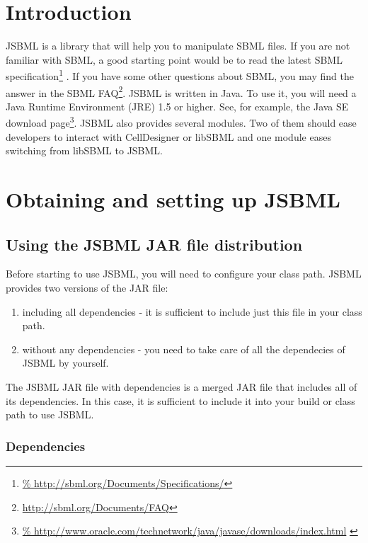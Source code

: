 \section{Introduction}

JSBML is a library that will help you to manipulate SBML files. If you are not
familiar with SBML, a good starting point would be to read the latest SBML
specification\footnote{\url{%
http://sbml.org/Documents/Specifications/}} \citep{Hucka2010a}. If you have some
other questions about SBML, you may find the answer in the SBML
FAQ\footnote{\url{http://sbml.org/Documents/FAQ}}. JSBML is written in Java\TTra. To
use it, you will need a Java Runtime Environment (JRE) 1.5 or higher. See, for
example, the Java SE download page\footnote{\url{%
http://www.oracle.com/technetwork/java/javase/downloads/index.html}
\label{fn:jvmldl}}.
JSBML also provides several modules. Two of them should ease developers to
interact with CellDesigner or libSBML and one module eases switching from
libSBML to JSBML.


\section{Obtaining and setting up JSBML}

\subsection{Using the JSBML JAR file distribution}
Before starting to use JSBML, you will need to configure your class path. JSBML
provides two versions of the JAR file:
\begin{enumerate}
\item including all dependencies - it is sufficient to include just this file in
      your class path.
\item without any dependencies - you need to take care of all the dependecies of
      JSBML by yourself.
\end{enumerate}

The JSBML JAR file with dependencies is a merged JAR file that includes all of
its dependencies. In this case, it is sufficient to include
it into your build or class path to use JSBML.



\subsubsection{Dependencies}
%

